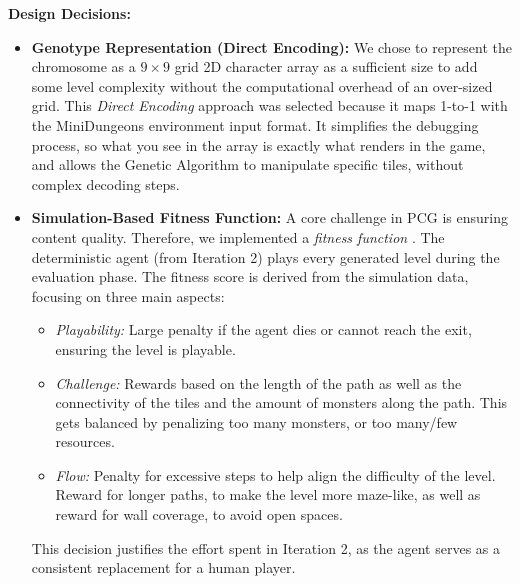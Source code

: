 \textbf{Design Decisions:}
\begin{itemize}
    \item \textbf{Genotype Representation (Direct Encoding):}
    We chose to represent the chromosome as a $9 \times 9$ grid 2D character array as a sufficient size to add some level complexity without the computational overhead of an over-sized grid.
    This \textit{Direct Encoding} approach was selected because it maps 1-to-1 with the MiniDungeons environment input format.
    It simplifies the debugging process, so what you see in the array is exactly what renders in the game, and allows the Genetic Algorithm to manipulate specific tiles, without complex decoding steps.

    \item \textbf{Simulation-Based Fitness Function:}
    A core challenge in PCG is ensuring content quality.
    Therefore, we implemented a \textit{fitness function} \cite{Experience_Driven_PCG}.
    The deterministic agent (from Iteration 2) \cite{holmgard2014evolvingpersonas} plays every generated level during the evaluation phase.
    The fitness score is derived from the simulation data, focusing on three main aspects:
    \begin{itemize}
        \item \textit{Playability:} Large penalty if the agent dies or cannot reach the exit, ensuring the level is playable.
        \item \textit{Challenge:} Rewards based on the length of the path as well as the connectivity of the tiles and the amount of monsters along the path. This gets balanced by penalizing too many monsters, or too many/few resources.
        \item \textit{Flow:} Penalty for excessive steps to help align the difficulty of the level. Reward for longer paths, to make the level more maze-like, as well as reward for wall coverage, to avoid open spaces.
    \end{itemize}
    This decision justifies the effort spent in Iteration 2, as the agent serves as a consistent replacement for a human player.


\end{itemize}
